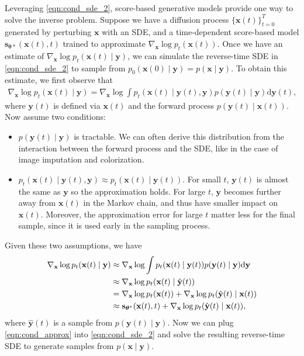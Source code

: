 \documentclass{article} %
\newcommand{\ud}{\mathrm{d}}
\newcommand{\bfx}{\mathbf{x}}
\newcommand{\bftheta}{{\boldsymbol{\theta}}}
\newcommand{\bfy}{\mathbf{y}}
\newcommand{\bfs}{\mathbf{s}}
\begin{document}
Leveraging \cref{eqn:cond_sde_2}, score-based generative models provide one way to solve the inverse problem. Suppose we have a diffusion process $\{\bfx(t)\}_{t=0}^T$ generated by perturbing $\bfx$ with an SDE, and a time-dependent score-based model $\bfs_{\bftheta*}(\bfx(t), t)$ trained to approximate $\nabla_\bfx \log p_t(\bfx(t))$. Once we have an estimate of $\nabla_\bfx \log p_t(\bfx(t) \mid \bfy)$, we can simulate the reverse-time SDE in \cref{eqn:cond_sde_2} to sample from $p_0(\bfx(0) \mid \bfy) = p(\bfx \mid \bfy)$. To obtain this estimate, we first observe that
\begin{align*}
    \nabla_\bfx \log p_t(\bfx(t) \mid \bfy) = \nabla_\bfx \log \int p_t(\bfx(t) \mid \bfy(t), \bfy) p(\bfy(t) \mid \bfy) \ud \bfy(t),
\end{align*}
where $\bfy(t)$ is defined via $\bfx(t)$ and the forward process $p(\bfy(t) \mid \bfx(t))$. Now assume two conditions:
\begin{itemize}
    \item $p(\bfy(t) \mid \bfy)$ is tractable. We can often derive this distribution from the interaction between the forward process and the SDE, like in the case of image imputation and colorization.
    \item $p_t(\bfx(t) \mid \bfy(t), \bfy) \approx p_t(\bfx(t) \mid \bfy(t))$. For small $t$, $\bfy(t)$ is almost the same as $\bfy$ so the approximation holds. For large $t$, $\bfy$ becomes further away from $\bfx(t)$ in the Markov chain, and thus have smaller impact on $\bfx(t)$. Moreover, the approximation error for large $t$ matter less for the final sample, since it is used early in the sampling process.
\end{itemize}
Given these two assumptions, we have
\begin{align}
    \nabla_\bfx \log p_t(\bfx(t) \mid \bfy) &\approx \nabla_\bfx \log \int p_t(\bfx(t) \mid \bfy(t)) p(\bfy(t) \mid \bfy) \ud \bfy \notag\\
    &\approx \nabla_\bfx \log p_t(\bfx(t) \mid \hat{\bfy}(t)) \notag\\
    &= \nabla_\bfx \log p_t(\bfx(t)) + \nabla_\bfx \log p_t(\hat{\bfy}(t) \mid \bfx(t)) \notag\\
    &\approx \bfs_{\bftheta^*}(\bfx(t), t) + \nabla_\bfx \log p_t(\hat{\bfy}(t) \mid \bfx(t)), \label{eqn:cond_approx}
\end{align}
where $\hat{\bfy}(t)$ is a sample from $p(\bfy(t) \mid \bfy)$. Now we can plug \cref{eqn:cond_approx} into \cref{eqn:cond_sde_2} and solve the resulting reverse-time SDE to generate samples from $p(\bfx \mid \bfy)$.
\end{document}
